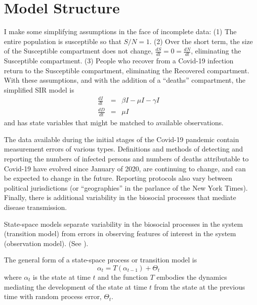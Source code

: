 \documentclass[12pt,letterpaper]{article}
\begin{document}
\section*{Model Structure}
I make some simplifying assumptions in the face of incomplete data: 
(1) The entire population is susceptible so that $S/N = 1$. 
(2) Over the short term, the size of the
Susceptible compartment does not change, 
$\frac{dS}{dt} = 0 = \frac{dN}{dt}$,
eliminating the Susceptible compartment.
(3) People who recover from a Covid-19 infection return to the Susceptible
compartment, eliminating the Recovered compartment. 
With these assumptions, and with the addition of a ``deaths''
compartment, the simplified SIR model is
\begin{eqnarray}
\label{eqn:sSIRI}
\frac{dI}{dt} &=&  \beta I - \mu I -\gamma I\\
\label{eqn:sSIRD}
\frac{dD}{dt} &=& \mu I
\end{eqnarray}
and has state variables that might be matched to available observations.

The data available during the initial stages of the Covid-19 pandemic
contain measurement errors of various types.
Definitions and methods of detecting and reporting the numbers of
infected persons and numbers of deaths attributable to Covid-19 have
evolved since January of 2020, are continuing to change, and can be
expected to change in the future.
Reporting protocols also vary between political jurisdictions (or
``geographies'' in the parlance of the New York Times).
Finally, there is additional variability in the biosocial
processes that mediate disease transmission.

State-space models separate variability in the biosocial
processes in the system (transition model)
from errors in observing features of interest
in the system (observation model).
(See \cite{Harvey1990}).

The general form of a state-space process or transition model is
\begin{equation}
\alpha_t=T(\alpha_{t-1}) + \Theta_t
\end{equation}
where $\alpha_t$ is the state at time $t$ and 
the function $T$ embodies the dynamics mediating the
development of the state at time $t$ from the state at the previous
time with random process error, $\Theta_t$.
\end{document}
